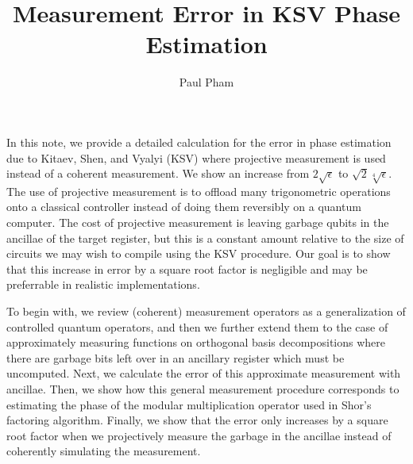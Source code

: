 \documentclass{article}
\title{Measurement Error in KSV Phase Estimation}
\author{Paul Pham}
\theoremstyle{definition} \newtheorem{lemma}{Lemma}
\theoremstyle{definition} \newtheorem{theorem}{Theorem}
\begin{document}
\maketitle

In this note, we provide a detailed calculation for the error in
phase estimation due to Kitaev, Shen, and Vyalyi (KSV) where projective
measurement is used instead of a coherent measurement. We show an
increase from $2\sqrt{\epsilon}$ to $\sqrt{2}\sqrt[4]{\epsilon}$. The use
of projective measurement is to offload many trigonometric operations
onto a classical controller instead of doing them reversibly on a quantum
computer. The cost of projective measurement is leaving garbage qubits in
the ancillae of the target register, but this is a constant amount relative to
the size of circuits we may wish to compile using the KSV procedure.
Our goal is to show that this increase in error by a square root
factor is negligible and may be preferrable in realistic implementations.

To begin with, we review (coherent) measurement operators as a generalization of
controlled quantum operators, and then we further extend them to the case
of approximately measuring functions on orthogonal basis decompositions
where there are garbage bits left over in an ancillary register which must
be uncomputed.
Next, we calculate the error of this approximate measurement with ancillae.
Then, we show how this general measurement procedure corresponds to
estimating the phase of the modular multiplication operator used in
Shor's factoring algorithm. Finally, we show that the error only
increases by a square root factor when we projectively measure the garbage
in the ancillae instead of coherently simulating the measurement.









\end{document}
